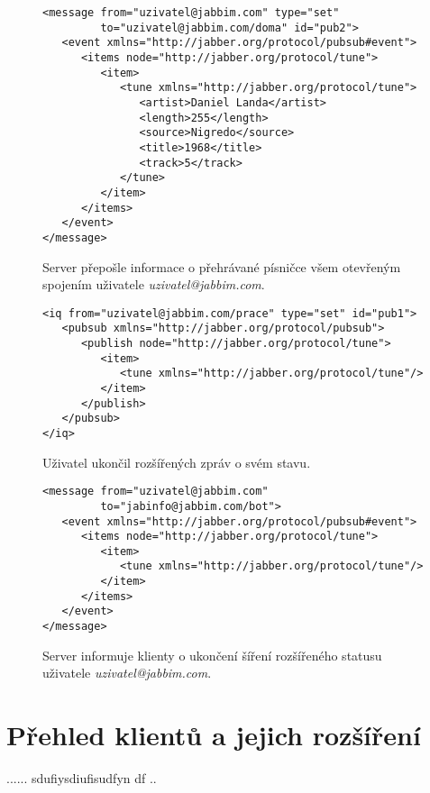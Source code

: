 \begin{figure}[ht]
\begin{verbatim}
<message from="uzivatel@jabbim.com" type="set"
         to="uzivatel@jabbim.com/doma" id="pub2">
   <event xmlns="http://jabber.org/protocol/pubsub#event">
      <items node="http://jabber.org/protocol/tune">
         <item>
            <tune xmlns="http://jabber.org/protocol/tune">
               <artist>Daniel Landa</artist>
               <length>255</length>
               <source>Nigredo</source>
               <title>1968</title>
               <track>5</track>
            </tune>
         </item>
      </items>
   </event>
</message>
\end{verbatim}  
\caption{Server přepošle informace o přehrávané písničce všem otevřeným spojením uživatele \textit{uzivatel@jabbim.com}.}
 \label{picSPep3}
\end{figure}

\begin{figure}[ht]
\begin{verbatim}
<iq from="uzivatel@jabbim.com/prace" type="set" id="pub1">
   <pubsub xmlns="http://jabber.org/protocol/pubsub">
      <publish node="http://jabber.org/protocol/tune">
         <item>
            <tune xmlns="http://jabber.org/protocol/tune"/>
         </item>
      </publish>
   </pubsub>
</iq>
\end{verbatim}  
\caption{Uživatel ukončil  rozšířených zpráv o svém stavu.}
 \label{picSPep4}
\end{figure}

\begin{figure}[ht]
\begin{verbatim}
<message from="uzivatel@jabbim.com"
         to="jabinfo@jabbim.com/bot">
   <event xmlns="http://jabber.org/protocol/pubsub#event">
      <items node="http://jabber.org/protocol/tune">
         <item>
            <tune xmlns="http://jabber.org/protocol/tune"/>
         </item>
      </items>
   </event>
</message>
\end{verbatim}  
\caption{Server informuje klienty o ukončení šíření rozšířeného statusu uživatele \textit{uzivatel@jabbim.com}.}
 \label{picSPep5}
\end{figure}

\chapter{Přehled klientů a jejich rozšíření}\label{Eklient}
...... sdufiysdiufisudfyn df ..

